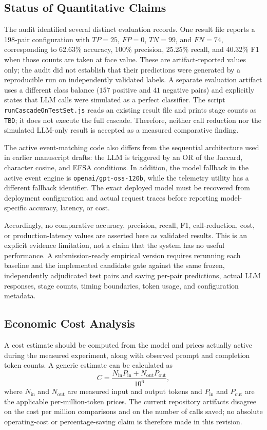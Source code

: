 \documentclass[conference]{IEEEtran}
\begin{document}
\subsection{Status of Quantitative Claims}
The audit identified several distinct evaluation records. One result file reports a 198-pair configuration with $TP=25$, $FP=0$, $TN=99$, and $FN=74$, corresponding to 62.63\% accuracy, 100\% precision, 25.25\% recall, and 40.32\% F1 when those counts are taken at face value. These are artifact-reported values only; the audit did not establish that their predictions were generated by a reproducible run on independently validated labels. A separate evaluation artifact uses a different class balance ($157$ positive and $41$ negative pairs) and explicitly states that LLM calls were simulated as a perfect classifier. The script \texttt{runCascadeOnTestSet.js} reads an existing result file and prints stage counts as \texttt{TBD}; it does not execute the full cascade. Therefore, neither call reduction nor the simulated LLM-only result is accepted as a measured comparative finding.

The active event-matching code also differs from the sequential architecture used in earlier manuscript drafts: the LLM is triggered by an OR of the Jaccard, character cosine, and EFSA conditions. In addition, the model fallback in the active event engine is \texttt{openai/gpt-oss-120b}, while the telemetry utility has a different fallback identifier. The exact deployed model must be recovered from deployment configuration and actual request traces before reporting model-specific accuracy, latency, or cost.

Accordingly, no comparative accuracy, precision, recall, F1, call-reduction, cost, or production-latency values are asserted here as validated results. This is an explicit evidence limitation, not a claim that the system has no useful performance. A submission-ready empirical version requires rerunning each baseline and the implemented candidate gate against the same frozen, independently adjudicated test pairs and saving per-pair predictions, actual LLM responses, stage counts, timing boundaries, token usage, and configuration metadata.

\subsection{Economic Cost Analysis}
A cost estimate should be computed from the model and prices actually active during the measured experiment, along with observed prompt and completion token counts. A generic estimate can be calculated as
\begin{equation}
C = \frac{N_{\mathrm{in}}P_{\mathrm{in}}+N_{\mathrm{out}}P_{\mathrm{out}}}{10^6},
\label{eq:cost}
\end{equation}
where $N_{\mathrm{in}}$ and $N_{\mathrm{out}}$ are measured input and output tokens and $P_{\mathrm{in}}$ and $P_{\mathrm{out}}$ are the applicable per-million-token prices. The current repository artifacts disagree on the cost per million comparisons and on the number of calls saved; no absolute operating-cost or percentage-saving claim is therefore made in this revision.
\end{document}
